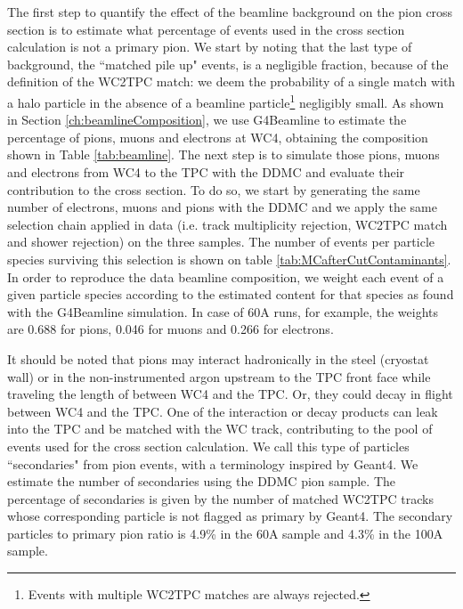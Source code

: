 The first step to quantify the effect of the beamline background on the pion cross section is to estimate what percentage of events used in the cross section calculation is not a primary pion.  We start by noting that the last type of background, the ``matched pile up" events, is a negligible fraction, because of the definition of the WC2TPC match: we deem the probability of a single match with a halo particle in the absence of a beamline particle\footnote{ Events with multiple WC2TPC matches are always rejected.} negligibly small. %
As shown in Section \ref{ch:beamlineComposition}, we use G4Beamline to estimate the percentage of pions, muons and electrons at WC4, obtaining the composition shown in Table \ref{tab:beamline}. The next step is to simulate those pions, muons and electrons from WC4 to the TPC with the DDMC and evaluate their contribution to the cross section. To do so, we start by generating the same number of electrons, muons and pions with the DDMC and we apply the same selection chain applied in data (i.e. track multiplicity rejection, WC2TPC match and shower rejection) on the three samples. The number of events per particle species surviving this selection is shown on table \ref{tab:MCafterCutContaminants}. In order to reproduce the data beamline composition, we weight each event of a given particle species according to the estimated content for that species as found with the G4Beamline simulation. In case of 60A runs, for example, the weights are 0.688 for pions,  0.046 for muons  and 0.266 for electrons.


It should be noted that pions may  interact hadronically in the steel (cryostat wall) or in the non-instrumented argon upstream to the TPC front face while traveling the length of between WC4 and the TPC. Or, they could decay in flight between WC4 and the TPC. One of the interaction or decay products can leak into the TPC and be matched with the WC track, contributing to the pool of events used for the cross section calculation. We call this type of particles ``secondaries" from pion events, with a terminology inspired by Geant4.  We estimate the number of secondaries using the DDMC pion sample.  The percentage of secondaries is given by the number of matched WC2TPC tracks whose corresponding particle is not flagged as primary by Geant4.  The secondary particles to primary pion ratio is 4.9\% in the 60A sample and 4.3\% in the 100A sample.





